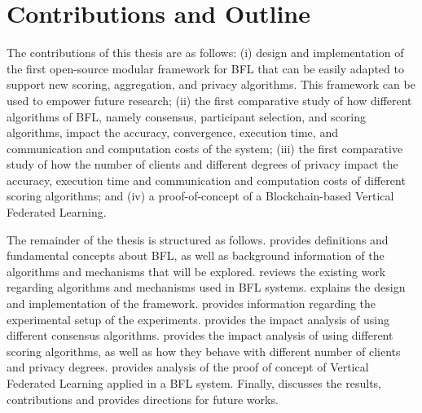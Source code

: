 \section{Contributions and Outline}\label{intro:outline}

The contributions of this thesis are as follows: (i) design and implementation of the first open-source modular framework for BFL that can be easily adapted to support new scoring, aggregation, and privacy algorithms. This framework can be used to empower future research; (ii) the first comparative study of how different algorithms of BFL, namely consensus, participant selection, and scoring algorithms, impact the accuracy, convergence, execution time, and communication and computation costs of the system; (iii) the first comparative study of how the number of clients and different degrees of privacy impact the accuracy, execution time and communication and computation costs of different scoring algorithms; and (iv) a proof-of-concept of a Blockchain-based Vertical Federated Learning.

The remainder of the thesis is structured as follows.  provides definitions and fundamental concepts about BFL, as well as background information of the algorithms and mechanisms that will be explored.  reviews the existing work regarding algorithms and mechanisms used in BFL systems.  explains the design and implementation of the framework.  provides information regarding the experimental setup of the experiments.  provides the impact analysis of using different consensus algorithms.  provides the impact analysis of using different scoring algorithms, as well as how they behave with different number of clients and privacy degrees.  provides analysis of the proof of concept of Vertical Federated Learning applied in a BFL system. Finally,  discusses the results, contributions and provides directions for future works.

